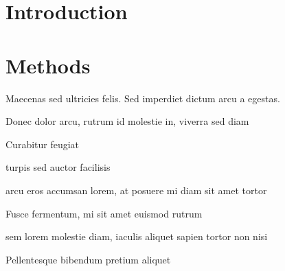 \documentclass[twoside]{article}
\title{\vspace{-15mm}\fontsize{24pt}{10pt}\selectfont\textbf{\myArticleTitle}} %
\author{
\large
\textsc{\myAuthorName}\\
\normalsize \myUni \\ %
\normalsize \href{mailto:\myAuthorEmail}{\myAuthorEmail} %
\vspace{-10mm}
}
\date{}
\renewcommand{\abstractname}{} %
\renewenvironment{abstract}
 {\normalsize
  \begin{center}
  \end{center}
  \list{}{
    \setlength{\leftmargin}{.0cm}%
    \setlength{\rightmargin}{\leftmargin}%
  }%
  \item\relax}
 {\endlist}
\begin{document}
\maketitle %

\thispagestyle{fancy} %


\begin{abstract}

\noindent \lipsum[1] %

\end{abstract}



\section{Introduction}

\lipsum[2-3] %


\section{Methods}

Maecenas sed ultricies felis. Sed imperdiet dictum arcu a egestas. 
\begin{compactitem}
\item Donec dolor arcu, rutrum id molestie in, viverra sed diam
\item Curabitur feugiat
\item turpis sed auctor facilisis
\item arcu eros accumsan lorem, at posuere mi diam sit amet tortor
\item Fusce fermentum, mi sit amet euismod rutrum
\item sem lorem molestie diam, iaculis aliquet sapien tortor non nisi
\item Pellentesque bibendum pretium aliquet
\end{compactitem}
\lipsum[4] %
\end{document}
